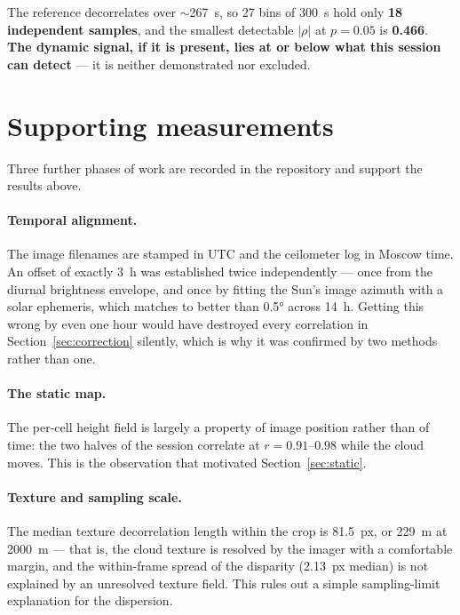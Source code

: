 \documentclass[11pt,a4paper]{article}
\newcommand{\rhoS}{\ensuremath{\rho}}
\begin{document}
The reference decorrelates over $\sim$\SI{267}{\second}, so 27 bins of \SI{300}{\second} hold
only \textbf{18 independent samples}, and the smallest detectable $|\rhoS|$ at $p=0.05$ is
\textbf{0.466}. \textbf{The dynamic signal, if it is present, lies at or below what this
session can detect} --- it is neither demonstrated nor excluded.


\section{Supporting measurements}
\label{sec:supporting}

Three further phases of work are recorded in the repository and support the results above.

\paragraph{Temporal alignment.} The image filenames are stamped in UTC and the ceilometer log
in Moscow time. An offset of exactly \SI{+3}{\hour} was established twice independently ---
once from the diurnal brightness envelope, and once by fitting the Sun's image azimuth with a
solar ephemeris, which matches to better than \ang{0.5} across \SI{14}{\hour}. Getting this
wrong by even one hour would have destroyed every correlation in
Section~\ref{sec:correction} silently, which is why it was confirmed by two methods rather
than one.

\paragraph{The static map.} The per-cell height field is largely a property of image position
rather than of time: the two halves of the session correlate at $r = 0.91$--$0.98$ while the
cloud moves. This is the observation that motivated Section~\ref{sec:static}.

\paragraph{Texture and sampling scale.} The median texture decorrelation length within the
crop is \SI{81.5}{px}, or \SI{229}{\metre} at \SI{2000}{\metre} --- that is, the cloud texture
is resolved by the imager with a comfortable margin, and the within-frame spread of the
disparity (\SI{2.13}{px} median) is not explained by an unresolved texture field. This rules
out a simple sampling-limit explanation for the dispersion.
\end{document}
